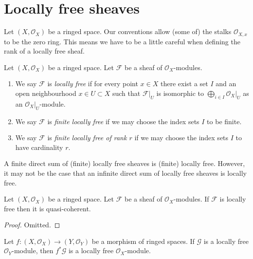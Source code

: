 \section{Locally free sheaves}
\label{section-locally-free}

\noindent
Let $(X, \mathcal{O}_X)$ be a ringed space.
Our conventions allow (some of) the stalks $\mathcal{O}_{X, x}$
to be the zero ring. This means we have to be a little careful
when defining the rank of a locally free sheaf.

\begin{definition}
\label{definition-locally-free}
Let $(X, \mathcal{O}_X)$ be a ringed space.
Let $\mathcal{F}$ be a sheaf of $\mathcal{O}_X$-modules.
\begin{enumerate}
\item We say $\mathcal{F}$ is {\it locally free} if for every
point $x \in X$ there exist a set $I$ and an open
neighbourhood $x \in U \subset X$
such that $\mathcal{F}|_U$ is isomorphic to
$\bigoplus_{i \in I} \mathcal{O}_X|_U$ as an $\mathcal{O}_X|_U$-module.
\item We say $\mathcal{F}$ is {\it finite locally free} if we may
choose the index sets $I$ to be finite.
\item We say $\mathcal{F}$ is {\it finite locally free of rank $r$}
if we may choose the index sets $I$ to have cardinality $r$.
\end{enumerate}
\end{definition}

\noindent
A finite direct sum of (finite) locally free sheaves is (finite)
locally free. However, it may not be the case that an infinite direct
sum of locally free sheaves is locally free.

\begin{lemma}
\label{lemma-locally-free-quasi-coherent}
Let $(X, \mathcal{O}_X)$ be a ringed space.
Let $\mathcal{F}$ be a sheaf of $\mathcal{O}_X$-modules.
If $\mathcal{F}$ is locally free then it is quasi-coherent.
\end{lemma}

\begin{proof}
Omitted.
\end{proof}

\begin{lemma}
\label{lemma-pullback-locally-free}
Let $f : (X, \mathcal{O}_X) \to (Y, \mathcal{O}_Y)$
be a morphism of ringed spaces. If $\mathcal{G}$ is
a locally free $\mathcal{O}_Y$-module, then
$f^*\mathcal{G}$ is a locally free $\mathcal{O}_X$-module.
\end{lemma}

